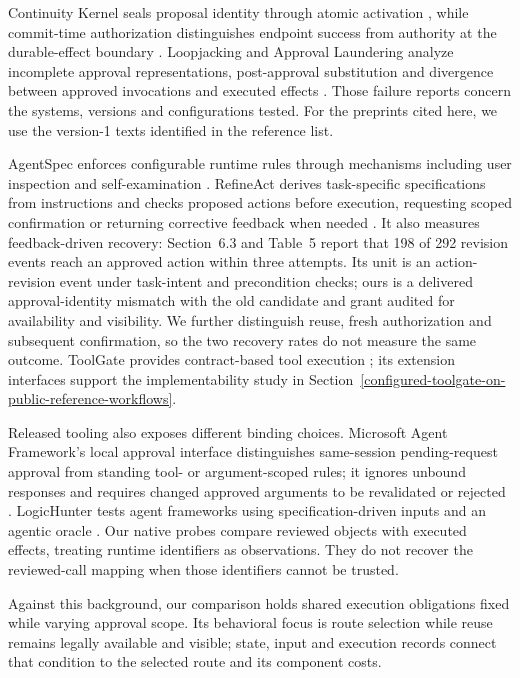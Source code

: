 \documentclass[pdflatex,sn-basic]{sn-jnl}
\begin{document}
Continuity Kernel seals proposal identity through atomic activation \citep{continuity-kernel}, while commit-time authorization distinguishes endpoint success from authority at the durable-effect boundary \citep{commit-time-auth}. Loopjacking and Approval Laundering analyze incomplete approval representations, post-approval substitution and divergence between approved invocations and executed effects \citep{kumar2026loopjacking,wang2026approval}. Those failure reports concern the systems, versions and configurations tested. For the preprints cited here, we use the version-1 texts identified in the reference list.

AgentSpec enforces configurable runtime rules through mechanisms including user inspection and self-examination \citep{agentspec2026}. RefineAct derives task-specific specifications from instructions and checks proposed actions before execution, requesting scoped confirmation or returning corrective feedback when needed \citep{refineact2026}. It also measures feedback-driven recovery: Section~6.3 and Table~5 report that 198 of 292 revision events reach an approved action within three attempts. Its unit is an action-revision event under task-intent and precondition checks; ours is a delivered approval-identity mismatch with the old candidate and grant audited for availability and visibility. We further distinguish reuse, fresh authorization and subsequent confirmation, so the two recovery rates do not measure the same outcome. ToolGate provides contract-based tool execution \citep{toolgate}; its extension interfaces support the implementability study in Section~\ref{configured-toolgate-on-public-reference-workflows}.

Released tooling also exposes different binding choices. Microsoft Agent Framework's local approval interface distinguishes same-session pending-request approval from standing tool- or argument-scoped rules; it ignores unbound responses and requires changed approved arguments to be revalidated or rejected \citep{msaf-tool-approval}. LogicHunter tests agent frameworks using specification-driven inputs and an agentic oracle \citep{logicunter}. Our native probes compare reviewed objects with executed effects, treating runtime identifiers as observations. They do not recover the reviewed-call mapping when those identifiers cannot be trusted.

Against this background, our comparison holds shared execution obligations fixed while varying approval scope. Its behavioral focus is route selection while reuse remains legally available and visible; state, input and execution records connect that condition to the selected route and its component costs.
\end{document}
